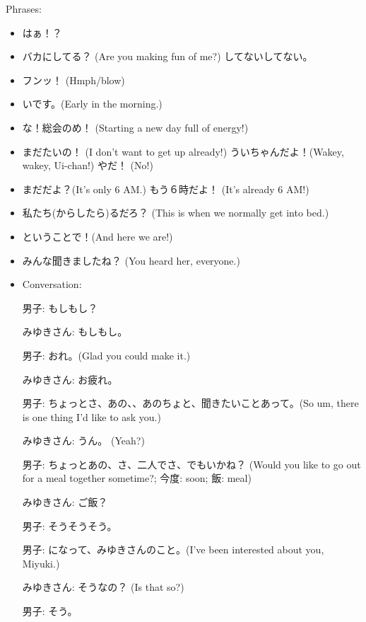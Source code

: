 \documentclass{article}
\begin{document}
Phrases:
\begin{itemize}
    \item はぁ！？
    \item バカにしてる？ (Are you making fun of me?) してないしてない。
    \item フンッ！ (Hmph/blow)
    \item {}いです。(Early in the morning.)
    \item {}な！総会のめ！ (Starting a new day full of energy!)
    \item まだたいの！ (I don't want to get up already!) ういちゃんだよ！(Wakey, wakey, Ui-chan!) やだ！ (No!)
    \item まだだよ？(It's only 6 AM.) もう６時だよ！ (It's already 6 AM!)
    \item 私たち(からしたら)るだろ？ (This is when we normally get into bed.)
    \item ということで！(And here we are!)
    \item みんな聞きましたね？ (You heard her, everyone.)

    \item Conversation: %

    男子: もしもし？

    みゆきさん: もしもし。

    男子: おれ。(Glad you could make it.)

    みゆきさん: お疲れ。

    男子: ちょっとさ、あの、、あのちょと、聞きたいことあって。(So um, there is one thing I'd like to ask you.)

    みゆきさん: うん。 (Yeah?)

    男子: ちょっとあの、さ、二人でさ、でもいかね？ (Would you like to go out for a meal together sometime?; 今度: soon; 飯: meal)

    みゆきさん: ご飯？

    男子: そうそうそう。

    男子: になって、みゆきさんのこと。(I've been interested about you, Miyuki.)

    みゆきさん: そうなの？ (Is that so?)

    男子: そう。


\end{itemize}
\end{document}
